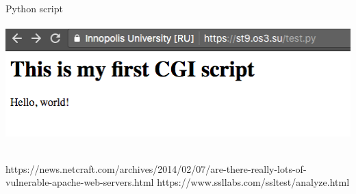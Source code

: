 \documentclass[10pt]{article}
\begin{document}
Python script \\ \\
\includegraphics[width=\textwidth, scale=0.5]{cgi}\\ \\

\begin{thebibliography}{9}
https://news.netcraft.com/archives/2014/02/07/are-there-really-lots-of-vulnerable-apache-web-servers.html
https://www.ssllabs.com/ssltest/analyze.html
\end{thebibliography}
\end{document}
